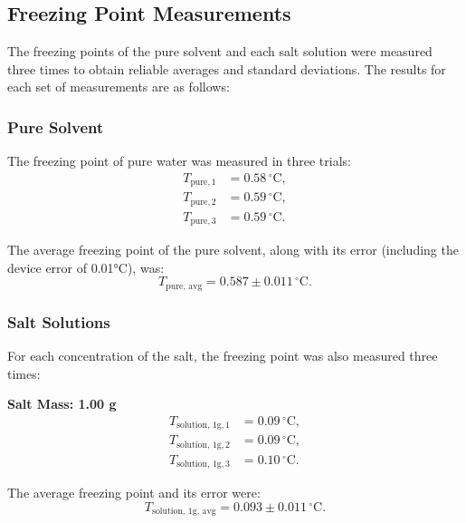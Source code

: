 \documentclass[a4paper,12pt]{article}
\begin{document}
\subsection{Freezing Point Measurements}
The freezing points of the pure solvent and each salt solution were measured three times to obtain reliable averages and standard deviations. The results for each set of measurements are as follows:

\subsubsection{Pure Solvent}
The freezing point of pure water was measured in three trials:
\begin{equation*}
\begin{aligned}
    T_{\text{pure}, 1} &= 0.58 \, ^\circ\text{C}, \\
    T_{\text{pure}, 2} &= 0.59 \, ^\circ\text{C}, \\
    T_{\text{pure}, 3} &= 0.59 \, ^\circ\text{C}.
\end{aligned}
\end{equation*}

The average freezing point of the pure solvent, along with its error (including the device error of 0.01°C), was:
\begin{equation}
T_{\text{pure, avg}} = 0.587 \pm 0.011 \, ^\circ\text{C}.
\end{equation}

\subsubsection{Salt Solutions}
For each concentration of the salt, the freezing point was also measured three times:

\textbf{Salt Mass: 1.00 g}
\begin{equation*}
\begin{aligned}
    T_{\text{solution, 1g}, 1} &= 0.09 \, ^\circ\text{C}, \\
    T_{\text{solution, 1g}, 2} &= 0.09 \, ^\circ\text{C}, \\
    T_{\text{solution, 1g}, 3} &= 0.10 \, ^\circ\text{C}.
\end{aligned}
\end{equation*}

The average freezing point and its error were:
\begin{equation}
T_{\text{solution, 1g, avg}} = 0.093 \pm 0.011 \, ^\circ\text{C}.
\end{equation}
\end{document}

